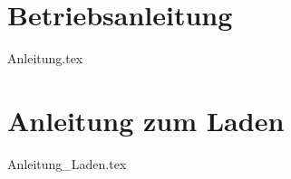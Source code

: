 \documentclass[paper=a4,12pt]{scrreprt}
\begin{document}
\section{Betriebsanleitung}
{Anleitung.tex}

\section{Anleitung zum Laden \label{sec:Anleitung_Laden}}
{Anleitung_Laden.tex}

\clearpage
\appendix
\def\chapterpagestyle{empty} 




\setcounter{lofdepth}{2}
\dipalistoffigures

\setcounter{lotdepth}{2}
\dipalistoftables

\newpage

 
 
\end{document}
